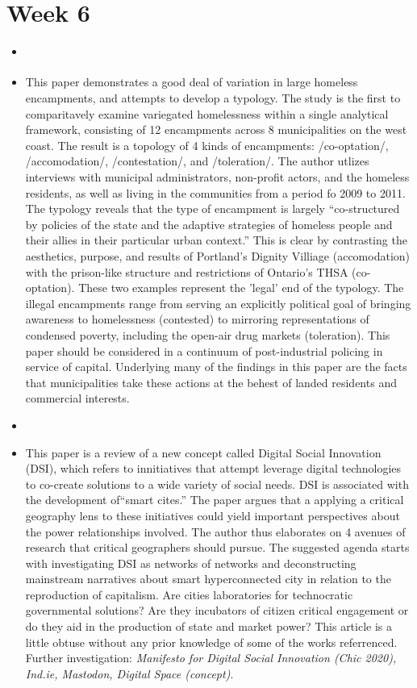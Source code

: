 \documentclass{article} \usepackage{filecontents}
\begin{document}
\section{Week 6}
\begin{itemize}
\item \cite{herring2014NewLogics}
\item This paper demonstrates a good deal of variation in large
  homeless encampments, and attempts to develop a typology. The study
  is the first to comparitavely examine variegated homelessness within
  a single analytical framework, consisting of 12 encampments across 8
  municipalities on the west coast. The result is a topology of 4
  kinds of encampments: /co-optation/, /accomodation/, /contestation/,
  and /toleration/. The author utlizes interviews with municipal
  administrators, non-profit actors, and the homeless residents, as
  well as living in the communities from a period fo 2009 to 2011. The
  typology reveals that the type of encampment is largely
  ``co-structured by policies of the state and the adaptive strategies
  of homeless people and their allies in their particular urban
  context.'' This is clear by contrasting the aesthetics, purpose, and
  results of Portland's Dignity Villiage (accomodation) with the
  prison-like structure and restrictions of Ontario's THSA
  (co-optation). These two examples represent the 'legal' end of the
  typology. The illegal encampments range from serving an explicitly
  political goal of bringing awareness to homelessness (contested) to
  mirroring representations of condensed poverty, including the
  open-air drug markets (toleration). This paper should be considered
  in a continuum of post-industrial policing in service of
  capital. Underlying many of the findings in this paper are the facts
  that municipalities take these actions at the behest of landed
  residents and commercial interests.

\item \cite{certoma2020DigitalSocial}
\item This paper is a review of a new concept called Digital Social
  Innovation (DSI), which refers to innitiatives that attempt leverage
  digital technologies to co-create solutions to a wide variety of
  social needs. DSI is associated with the development of``smart
  cites.'' The paper argues that a applying a critical geography lens
  to these initiatives could yield important perspectives about the
  power relationships involved. The author thus elaborates on 4
  avenues of research that critical geographers should pursue. The
  suggested agenda starts with investigating DSI as networks of
  networks and deconstructing mainstream narratives about smart
  hyperconnected city in relation to the reproduction of
  capitalism. Are cities laboratories for technocratic governmental
  solutions? Are they incubators of citizen critical engagement or do
  they aid in the production of state and market power? This article
  is a little obtuse without any prior knowledge of some of the works
  referrenced. Further investigation: \emph{Manifesto for Digital
  Social Innovation (Chic 2020), Ind.ie, Mastodon, Digital Space
  (concept)}.


\end{itemize}
\end{document}
